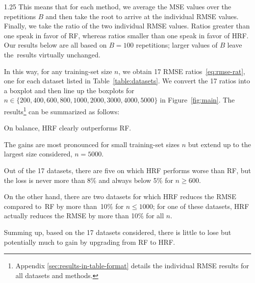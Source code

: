 \documentclass[12pt]{article}
\newenvironment{packed_itemize}{
\begin{itemize}
  \setlength{\itemsep}{1pt}
  \setlength{\parskip}{0pt} 
  \setlength{\parsep}{0pt}
}{\end{itemize}}
\numberwithin{equation}{section}
\theoremstyle{plain}
\begin{document}
\begin{spacing}{1.25}
This means that for each method, we average the MSE values over the
repetitions $B$ and then take the root to arrive at the individual RMSE
values. Finally, we take the ratio of the two individual RMSE values.
Ratios greater than one speak in favor of RF, whereas ratios
smaller than one speak in favor of HRF. Our results below are all
based on $B=100$ repetitions; larger values of $B$ leave the~results
virtually unchanged.

In this way, for any training-set size $n$, we obtain 17 RMSE
ratios~\eqref{eq:rmse-rat}, one for each dataset listed in
Table~\ref{table:datasets}. We convert the 17 ratios into a
boxplot and then line up the boxplots for
$n \in \{200, 400, 600, 800, 1000, 2000, 3000, 4000, 5000\}$ in
Figure~\ref{fig:main}. The results\footnote{Appendix \ref{sec:results-in-table-format} details the individual RMSE results for all datasets and methods.}
can be summarized as follows:
\begin{packed_itemize}
\item On balance, HRF clearly outperforms RF.
  
\item The gains are most pronounced for small training-set
  sizes $n$ but extend
  up to the largest size considered, $n=5000$.
  
\item Out of the 17 datasets, there are five on which HRF performs worse
  than RF, but the loss is never more than 8\% and always below 5\%
  for $n \ge 600$.

\item On the other hand, there are two datasets for which HRF reduces
  the RMSE compared to~RF
  by more than~10\% for $n \le 1000$; for one of these datasets,
  HRF actually reduces the RMSE by more than 10\% for all $n$.

\item Summing up, based on the 17 datasets considered, there is
  little to lose but potentially much to gain by upgrading from RF to HRF.  

\end{packed_itemize}

\noindent



\end{spacing}
\end{document}

